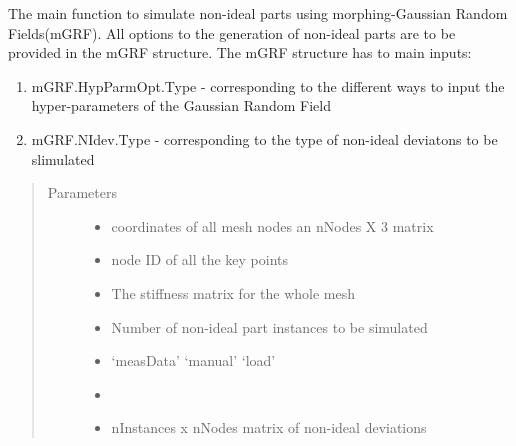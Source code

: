 \documentclass[a4paper,10pt,english]{sphinxmanual}
\begin{document}
\begin{fulllineitems}
\label{\detokenize{index:mGRF.getMgrfDev}}
The main function to simulate non-ideal parts using morphing-Gaussian Random
Fields(mGRF). All options to the generation of non-ideal parts are to be provided in the
mGRF structure. The mGRF structure has to main inputs:
\begin{enumerate}
%
\item {} 
mGRF.HypParmOpt.Type - corresponding to the different ways to input the hyper-parameters of the Gaussian Random Field

\item {} 
mGRF.NIdev.Type - corresponding to the type of non-ideal deviatons to be slimulated

\end{enumerate}
\begin{quote}\begin{description}
\item[{Parameters}] \leavevmode\begin{itemize}
\item {} 
 \textendash{} coordinates of all mesh nodes an nNodes X 3 matrix

\item {} 
 \textendash{} node ID of all the key points

\item {} 
 \textendash{} The stiffness matrix for the whole mesh

\item {} 
 \textendash{} Number of non-ideal part instances to be simulated

\item {} 
 \textendash{} ‘measData’ \textbar{} ‘manual’ \textbar{} ‘load’

\item {} 
 \textendash{} 

\item {} 
 \textendash{} nInstances x nNodes matrix of non-ideal  deviations


\end{itemize}
\end{description}
\end{quote}
\end{fulllineitems}
\end{document}

